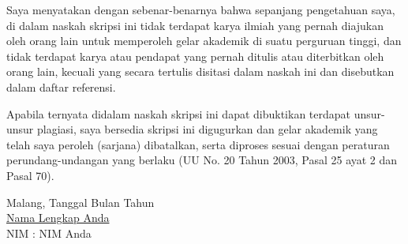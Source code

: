 \documentclass{skripsi}
\begin{document}
\cover

\approvalpage

{\orisinalitas

  Saya menyatakan dengan sebenar-benarnya bahwa sepanjang pengetahuan
  saya, di dalam naskah skripsi ini tidak terdapat karya ilmiah yang
  pernah diajukan oleh orang lain untuk memperoleh gelar akademik di
  suatu perguruan tinggi, dan tidak terdapat karya atau pendapat yang
  pernah ditulis atau diterbitkan oleh orang lain, kecuali yang secara
  tertulis disitasi dalam naskah ini dan disebutkan dalam daftar
  referensi.

  Apabila ternyata didalam naskah skripsi ini dapat dibuktikan
  terdapat unsur-unsur plagiasi, saya bersedia skripsi ini digugurkan
  dan gelar akademik yang telah saya peroleh (sarjana) dibatalkan,
  serta diproses sesuai dengan peraturan perundang-undangan yang
  berlaku (UU No. 20 Tahun 2003, Pasal 25 ayat 2 dan Pasal 70).
  \vspace{1.5cm}

  \noindent
  \hspace*{8cm}Malang, Tanggal Bulan Tahun   \vspace{2.5cm}   \\

  \hspace*{7cm}\underline{Nama Lengkap Anda} \\
  \hspace*{8cm}NIM : NIM Anda
}
\end{document}
